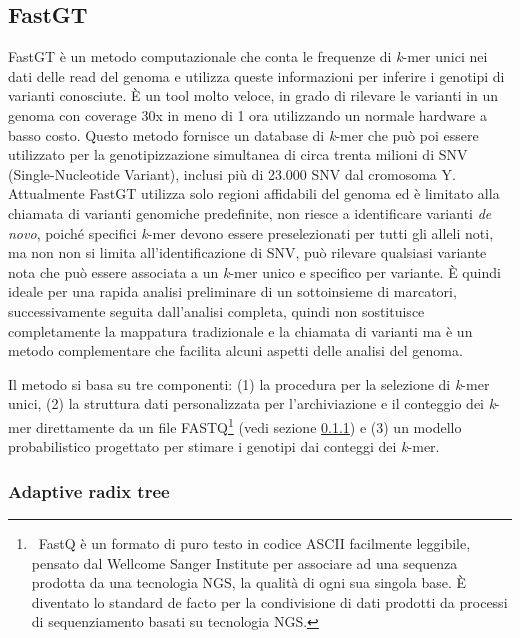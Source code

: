 \documentclass[../main.tex]{subfiles}
\begin{document}
\subsection{FastGT}
\label{fastgt}

FastGT \cite{pajuste2017fastgt} è un metodo computazionale che conta le frequenze di \textit{k}-mer unici nei dati delle read del genoma e utilizza queste informazioni per inferire i genotipi di varianti conosciute. È un tool molto veloce, in grado di rilevare le varianti in un genoma con coverage 30x in meno di 1 ora utilizzando un normale hardware a basso costo. Questo metodo fornisce un database di \textit{k}-mer che può poi essere utilizzato per la genotipizzazione simultanea di circa trenta milioni di SNV (Single-Nucleotide Variant), inclusi più di 23.000 SNV dal cromosoma Y. Attualmente FastGT utilizza solo regioni affidabili del genoma ed è limitato alla chiamata di varianti genomiche predefinite, non riesce a identificare varianti \textit{de novo}, poiché specifici \textit{k}-mer devono essere preselezionati per tutti gli alleli noti, ma non non si limita all'identificazione di SNV, può rilevare qualsiasi variante nota che può essere associata a un \textit{k}-mer unico e specifico per variante. È quindi ideale per una rapida analisi preliminare di un sottoinsieme di marcatori, successivamente seguita dall'analisi completa, quindi non sostituisce completamente la mappatura tradizionale e la chiamata di varianti ma è un metodo complementare che facilita alcuni aspetti delle analisi del genoma.

Il metodo si basa su tre componenti: (1) la procedura per la selezione di \textit{k}-mer unici, (2) la struttura dati personalizzata per l'archiviazione e il conteggio dei \textit{k}-mer direttamente da un file FASTQ\footnote{\ FastQ è un formato di puro testo in codice ASCII facilmente leggibile, pensato dal Wellcome Sanger Institute per associare ad una sequenza prodotta da una tecnologia NGS, la qualità di ogni sua singola base. È diventato lo standard de facto per la condivisione di dati \cite{cock2010sanger} \label{nota:FASTQ} prodotti da processi di sequenziamento basati su tecnologia NGS.} (vedi sezione \ref{AdaptiveRadixTree}) e (3) un modello probabilistico progettato per stimare i genotipi dai conteggi dei \textit{k}-mer.


\subsubsection{Adaptive radix tree}
\label{AdaptiveRadixTree}
\end{document}
